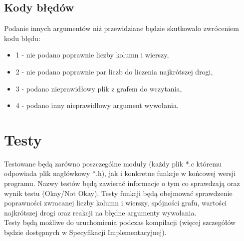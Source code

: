 \documentclass{article}
\begin{document}
\subsection{Kody błędów}
Podanie innych argumentów niż przewidziane będzie skutkowało zwróceniem kodu błędu:
\begin{itemize}
\item 1 - nie podano poprawnie liczby kolumn i wierszy,
\item 2 - nie podano poprawnie par liczb do liczenia najkrótszej drogi,
\item 3 - podano nieprawidłowy plik z grafem do wczytania,
\item 4 - podano inny nieprawidłowy argument wywołania.
\end{itemize}

\section{Testy}
Testowane będą zarówno poszczególne moduły (każdy plik *.c któremu odpowiada plik nagłówkowy *.h), jak i konkretne funkcje w końcowej wersji programu.
Nazwy testów będą zawierać informacje o tym co sprawdzają oraz wynik testu (Okay/Not Okay).
Testy funkcji będą obejmować sprawdzenie poprawności zwracanej liczby kolumn i wierszy, spójności grafu, wartości najkrótszej drogi oraz reakcji na błędne argumenty wywołania.
\\Testy będą możliwe do uruchomienia podczas kompilacji (więcej szczegółów będzie dostępnych w Specyfikacji Implementacyjnej).
\end{document}
